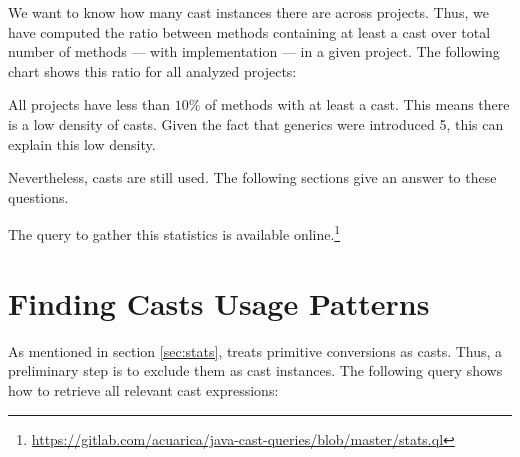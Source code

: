 We want to know how many cast instances there are across projects.
Thus, we have computed the ratio between methods containing at least a cast over total number of methods --- with implementation --- in a given project.
The following chart shows this ratio for all analyzed projects:


All projects have less than $10\%$ of methods with at least a cast.
This means there is a low density of casts.
Given the fact that generics were introduced \java{} 5, this can explain this low density.

Nevertheless, casts are still used.
The following sections give an answer to these questions.

The query to gather this statistics is available online.\footnote{\url{https://gitlab.com/acuarica/java-cast-queries/blob/master/stats.ql}}







\section{Finding Casts Usage Patterns}

\label{sec:methodology}

As mentioned in section \ref{sec:stats}, \ql{} treats primitive conversions as casts.
Thus, a preliminary step is to exclude them as cast instances.
The following \ql{} query shows how to retrieve all relevant cast expressions:


